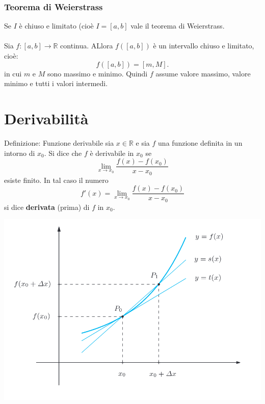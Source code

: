 \documentclass[x11names]{article}
\begin{document}
	
	\begin{center}
		\colorbox{myred}{\begin{minipage}{5.75in}
				\begin{redes}{}
					\subsubsection{Teorema di Weierstrass}
					Se $I$ è chiuso e limitato (cioè $I=\left[a,b\right]$ vale il teorema di Weierstrass.
					\\ \\
					Sia $f:\left[a,b\right] \rightarrow \mathbb{R}$ continua. ALlora $f\left(\left[a,b\right]\right)$ è un intervallo chiuso e limitato, cioè:
					\[
					f\left(\left[a,b\right]\right) = \left[m,M\right]
					.\] 
					in cui $m$ e $M$ sono massimo e minimo. Quindi $f$ assume valore massimo, valore minimo e tutti i valori intermedi.
				\end{redes}
		\end{minipage}}        
	\end{center}
	
	
	
	\newpage
	\section{Derivabilità}
		\begin{center}
		\colorbox{myblue}{\begin{minipage}{5.75in}
				\begin{blues}{Definizione: Funzione derivabile}
					sia $x \in \mathbb{R}$ e sia $f$ una funzione definita in un intorno di $x_0$. Si dice che $f$ è derivabile in $x_0$ se
					\[
					\lim_{x \to x_0}\frac{f(x) - f(x_0)}{x - x_0}
					\]
					esiste finito. In tal caso il numero
					\[
					f'(x) = \lim_{x \to x_0}\frac{f(x) - f(x_0)}{x - x_0}
					\]
					si dice \textbf{derivata} (prima) di $f$ in $x_0$.
				\end{blues}
		\end{minipage}}       
	\end{center}
	
	\begin{center}
		\includegraphics[scale=0.4]{figures/derivata}
	\end{center}
	
\end{document}

